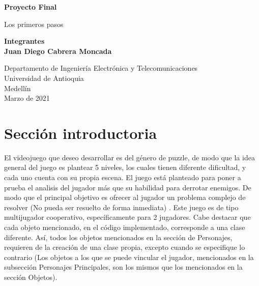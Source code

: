 \documentclass{article}
\begin{document}
\begin{titlepage}
    \begin{center}
        \vspace*{1cm}
            
        \Huge
        \textbf{Proyecto Final}
            
        \vspace{0.5cm}
        \LARGE
        Los primeros pasos
            
        \vspace{1.5cm}
            
        \textbf{Integrantes\\}
        \textbf{Juan Diego Cabrera Moncada}
            
        \vfill
            
        \vspace{0.8cm}
            
        \Large
        Departamento de Ingeniería Electrónica y Telecomunicaciones\\
        Universidad de Antioquia\\
        Medellín\\
        Marzo de 2021
            
    \end{center}
\end{titlepage}

\tableofcontents
\newpage
\section{Sección introductoria}\label{intro}
El videojuego que deseo desarrollar es del género de puzzle, de modo que la idea general del juego es plantear 5 niveles, los cuales tienen diferente dificultad, y cada uno cuenta con su propia escena. El juego está planteado para poner a prueba el analisis del jugador más que su habilidad para derrotar enemigos. De modo que el principal objetivo es ofrecer al jugador un problema complejo de resolver (No pueda ser resuelto de forma inmediata) \cite{Puzzle}. Este juego es de tipo multijugador cooperativo, específicamente para 2 jugadores. Cabe destacar que cada objeto mencionado, en el código implementado, corresponde a una clase diferente. Así, todos los objetos mencionados en la sección de Personajes, requieren de la creación de una clase propia, excepto cuando se especifique lo contrario (Los objetos a los que se puede vincular el jugador, mencionados en la subsección Personajes Principales, son los mismos que los mencionados en la sección Objetos).
\end{document}
